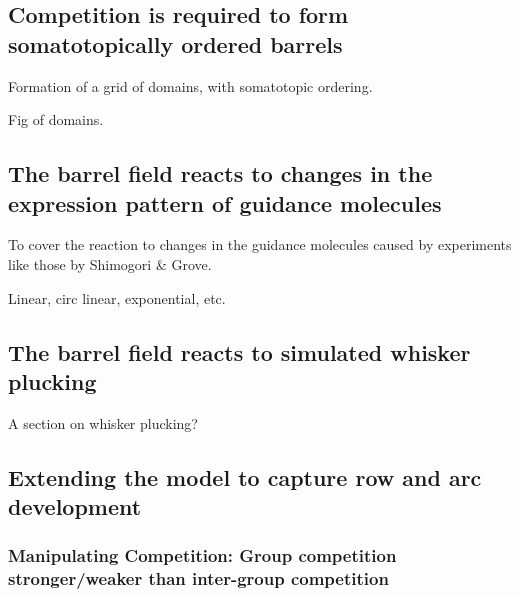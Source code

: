 \documentclass[a4paper,11pt]{article}
\begin{document}
\subsection*{Competition is required to form somatotopically ordered barrels}

Formation of a grid of domains, with somatotopic ordering.

Fig of domains.

\subsection*{The barrel field reacts to changes in the expression pattern of guidance molecules}

To cover the reaction to changes in the guidance molecules caused by
experiments like those by Shimogori \& Grove.

Linear, circ linear, exponential, etc.

\subsection*{The barrel field reacts to simulated whisker plucking}

A section on whisker plucking?




\subsection*{Extending the model to capture row and arc development}

\subsubsection*{Manipulating Competition: Group competition stronger/weaker than inter-group competition}
\end{document}
